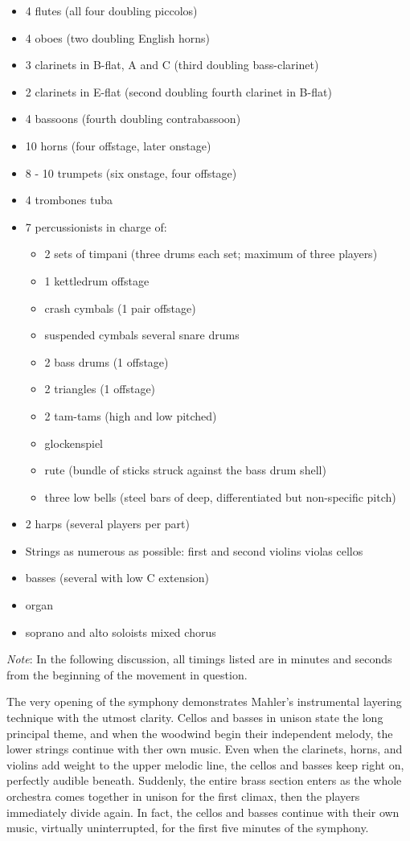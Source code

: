 \documentclass[12pt]{article}%
\begin{document}
\begin{itemize}
\item 4 flutes (all four doubling piccolos)
\item 4 oboes (two doubling English horns)
\item 3 clarinets in B-flat, A and C (third doubling bass-clarinet)
\item 2 clarinets in E-flat (second doubling fourth clarinet in B-flat)
\item 4 bassoons (fourth doubling contrabassoon)
\item 10 horns (four offstage, later onstage)
\item 8 - 10 trumpets (six onstage, four offstage)
\item 4 trombones tuba
\item 7 percussionists in charge of:
\begin{itemize}
\item 2 sets of timpani (three drums each set; maximum of three players)
\item 1 kettledrum offstage
\item crash cymbals (1 pair offstage)
\item suspended cymbals several snare drums
\item 2 bass drums (1 offstage)
\item 2 triangles (1 offstage)
\item 2 tam-tams (high and low pitched)
\item glockenspiel
\item rute (bundle of sticks struck against the bass drum shell)
\item three low bells (steel bars of deep, differentiated but non-specific pitch)
\end{itemize}

\item 2 harps (several players per part)
\item Strings as numerous as possible: first and second violins violas cellos
\item basses (several with low C extension)
\item organ
\item soprano and alto soloists mixed chorus
\end{itemize}

\noindent
{\it Note}: In the following discussion, all timings listed are in minutes and seconds from the beginning of the movement in question.

The very opening of the symphony demonstrates Mahler's instrumental layering technique with the utmost clarity. Cellos and basses in unison state the long principal theme, and when the woodwind begin their independent melody, the lower strings continue with ther own music. Even when the clarinets, horns, and violins add weight to the upper melodic line, the cellos and basses keep right on, perfectly
audible beneath. Suddenly, the entire brass section enters as the whole orchestra comes together in unison for the first climax, then the players immediately divide again. In fact, the cellos and basses continue with their own music, virtually uninterrupted, for the first five minutes of the symphony.
\end{document}
